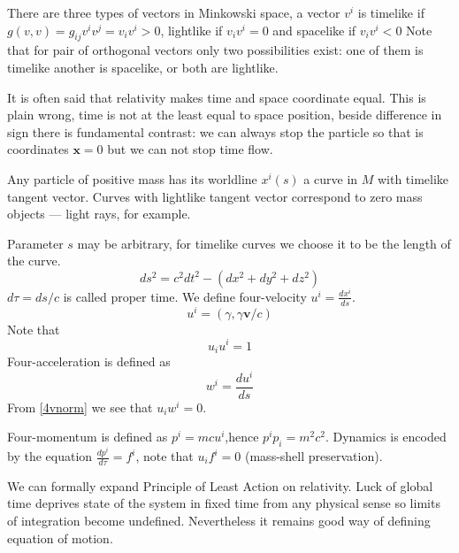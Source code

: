 There are three types of vectors in Minkowski space,
a vector $v^i$ is timelike if $g(v,v)= g_{ij} v^i v^j=v_i v^i>0$,
lightlike if $v_i v^i=0$ and spacelike if $v_i v^i<0$
Note that for pair of orthogonal vectors only two possibilities exist:
one of them is timelike another is spacelike, or both are lightlike.


It is often said that relativity makes time and space coordinate equal. 
This is plain wrong,
time is not at the least equal to space position, beside difference in sign there is fundamental contrast: we can always stop the particle so
that is coordinates $ \bm x=0 $ but we can not stop time flow. 

Any  particle of positive mass has its worldline $x^i(s)$ a curve in $M$ 
with timelike tangent vector. Curves with lightlike tangent vector 
correspond to zero mass objects --- light rays, for example.  

Parameter $ s $ may be arbitrary, for timelike curves we choose it to be the
length of the curve.
\begin{equation}
   \label {int4}
   ds^2=c^2 dt^2-(dx^2+dy^2+dz^2)
\end{equation}
$ d \tau = ds/c $ is called proper time.
We define four-velocity $u^i = \frac{dx^i}{ds}$.
\begin{equation}
   \label {vel4}
    u^i=(\gamma,\gamma \bm v/c)
\end{equation}
Note that 
\begin{equation}
   \label {4vnorm}
u_i u^i=1
\end{equation} 
Four-acceleration is defined as 
\begin{equation}
   \label {4acc}
 w^i = \frac{du^i}{ds}  
\end{equation}
From \eqref{4vnorm} we see that $ u_i w^i=0 $.

Four-momentum is defined as $p^i = m c u^i$,hence $ p^i p_i = m^2 c^2$.
Dynamics is encoded by the equation $\frac{dp^i}{d\tau} = f^i$, note that $ u_i f^i = 0$ (mass-shell preservation).

We can formally expand Principle of Least Action on relativity. Luck of global time 
deprives state of the system in fixed time from any physical sense so limits of integration
become undefined. Nevertheless it remains good way of defining equation of motion.

